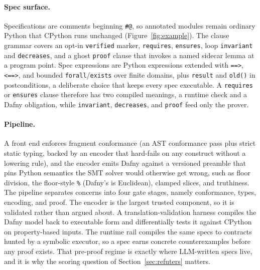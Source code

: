 \documentclass{article}
\begin{document}
\paragraph{Spec surface.} Specifications are comments beginning
\verb|#@|, so annotated modules remain ordinary Python that CPython runs
unchanged (Figure~\ref{fig:example}). The clause grammar covers an opt-in
\texttt{verified} marker, \texttt{requires}, \texttt{ensures}, loop
\texttt{invariant} and \texttt{decreases}, and a ghost \texttt{proof}
clause that invokes a named sidecar lemma at a program point. Spec
expressions are Python expressions extended with \verb|==>|, \verb|<==>|,
and bounded \texttt{forall}/\texttt{exists} over finite domains, plus
\texttt{result} and \texttt{old()} in postconditions, a deliberate choice
that keeps every spec executable. A \texttt{requires} or \texttt{ensures}
clause therefore has two compiled meanings, a runtime check and a Dafny
obligation, while \texttt{invariant}, \texttt{decreases}, and
\texttt{proof} feed only the prover.

\paragraph{Pipeline.} A front end enforces fragment conformance (an AST
conformance pass plus strict static typing, backed by an encoder that
hard-fails on any construct without a lowering rule), and the encoder emits
Dafny against a versioned preamble that pins Python semantics the SMT
solver would otherwise get wrong, such as floor division, the floor-style
\texttt{\%} (Dafny's is Euclidean), clamped slices, and truthiness. The
pipeline separates concerns into four gate stages, namely conformance,
types, encoding, and proof. The
encoder is the largest trusted component, so it is validated rather than
argued about. A translation-validation harness compiles the Dafny model
back to executable form and differentially tests it against CPython on
property-based inputs. The runtime rail compiles the same specs to
contracts hunted by a symbolic executor, so a spec earns concrete
counterexamples before any proof exists. That pre-proof regime is exactly
where LLM-written specs live, and it is why the scoring question of
Section~\ref{sec:refuters} matters.
\end{document}
